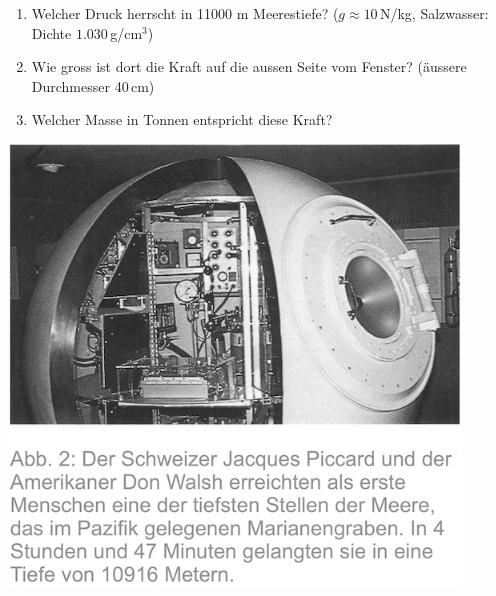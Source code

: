 \documentclass[11pt]{article}
\begin{document}
\begin{enumerate}
    \newpage
    \begin{minipage}{0.5\textwidth}
    \item 
    \begin{enumerate}
        \item Welcher Druck herrscht in 11000 m Meerestiefe? ($g \approx 10\,$N/kg, Salzwasser: Dichte $1.030\,$g/cm$^3$)

        \item Wie gross ist dort die Kraft auf die aussen Seite vom Fenster? (äussere Durchmesser 40\,cm)
        \item Welcher Masse in Tonnen entspricht diese Kraft?
        
    \end{enumerate} 
    \end{minipage}
    \begin{minipage}{0.45\textwidth}
        \begin{flushright}
    
            \includegraphics[width=0.9\textwidth]{images/Marianengraben.jpg}
    
            

        \end{flushright}
    \end{minipage}
    
\end{enumerate}
\end{document}
